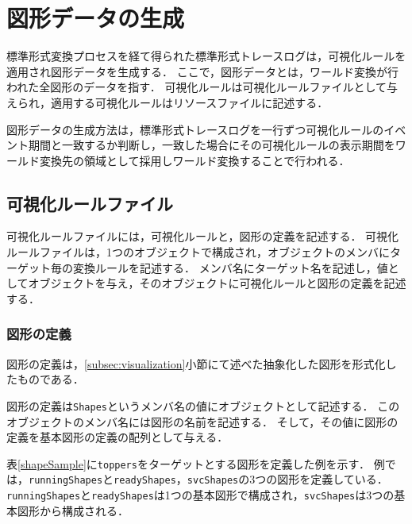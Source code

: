 \section{図形データの生成}

標準形式変換プロセスを経て得られた標準形式トレースログは，可視化ルールを適用され図形データを生成する．
ここで，図形データとは，ワールド変換が行われた全図形のデータを指す．
可視化ルールは可視化ルールファイルとして与えられ，適用する可視化ルールはリソースファイルに記述する．

図形データの生成方法は，標準形式トレースログを一行ずつ可視化ルールのイベント期間と一致するか判断し，一致した場合にその可視化ルールの表示期間をワールド変換先の領域として採用しワールド変換することで行われる．

\subsection{可視化ルールファイル}
\label{visualizeRuleSection}
可視化ルールファイルには，可視化ルールと，図形の定義を記述する．
可視化ルールファイルは，1つのオブジェクトで構成され，オブジェクトのメンバにターゲット毎の変換ルールを記述する．
メンバ名にターゲット名を記述し，値としてオブジェクトを与え，そのオブジェクトに可視化ルールと図形の定義を記述する．

\subsubsection{図形の定義}

図形の定義は，\ref{subsec:visualization}小節にて述べた抽象化した図形を形式化したものである．

図形の定義は{\tt Shapes}というメンバ名の値にオブジェクトとして記述する．
このオブジェクトのメンバ名には図形の名前を記述する．
そして，その値に図形の定義を基本図形の定義の配列として与える．

表\ref{shapeSample}に{\tt toppers}をターゲットとする図形を定義した例を示す．
例では，{\tt runningShapes}と{\tt readyShapes}，{\tt svcShapes}の3つの図形を定義している．
{\tt runningShapes}と{\tt readyShapes}は1つの基本図形で構成され，{\tt svcShapes}は3つの基本図形から構成される．


